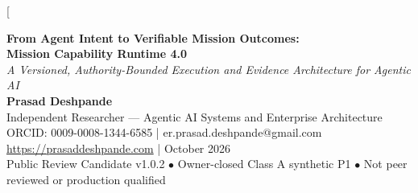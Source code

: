 \documentclass[11pt,twocolumn]{article}
\begin{document}
\twocolumn[{
\begin{center}
{\Large\bfseries\color{ink} From Agent Intent to Verifiable Mission Outcomes:}\\[4pt]
{\Large\bfseries\color{ink} Mission Capability Runtime 4.0}\\[6pt]
{\normalsize\itshape A Versioned, Authority-Bounded Execution and Evidence Architecture for Agentic AI}\\[12pt]
{\normalsize\bfseries Prasad Deshpande}\\[2pt]
{\small Independent Researcher --- Agentic AI Systems and Enterprise Architecture}\\[2pt]
{\small ORCID: 0009-0008-1344-6585 \quad | \quad er.prasad.deshpande@gmail.com}\\[2pt]
{\small \url{https://prasaddeshpande.com} \quad |  October 2026}\\[7pt]
{\small \color{muted} Public Review Candidate v1.0.2 \quad $\bullet$ \quad Owner-closed Class A synthetic P1 \quad $\bullet$ \quad Not peer reviewed or production qualified}
\end{center}
\vspace{4pt}
\quad
}
\end{document}
